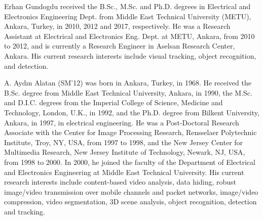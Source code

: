 \documentclass[journal]{IEEEtran}
\begin{document}
\clearpage
\begin{IEEEbiography}{Erhan Gundogdu}
received the B.Sc., M.Sc. and Ph.D. degrees in Electrical and Electronics Engineering Dept. from Middle East Technical University (METU), Ankara, Turkey, in 2010, 2012 and 2017, respectively. He was a Research Assistant at Electrical and Electronics Eng. Dept. at METU, Ankara, from 2010 to 2012, and is currently a Research Engineer in Aselsan Research Center, Ankara. His current research interests include visual tracking, object recognition, and detection.
\end{IEEEbiography}
\begin{IEEEbiography}{A. Ayd\i n Alatan}
(SM’12) was born in Ankara, Turkey, in 1968. He received the B.Sc. degree from Middle East Technical University, Ankara, in 1990, the M.Sc. and D.I.C. degrees from the Imperial College of Science, Medicine and Technology, London, U.K., in 1992, and the Ph.D. degree from Bilkent University, Ankara, in 1997, in electrical engineering. He was a Post-Doctoral Research Associate with the Center for Image Processing Research, Rensselaer Polytechnic Institute, Troy, NY, USA, from 1997 to 1998, and the New Jersey Center for Multimedia Research, New Jersey Institute of Technology, Newark, NJ, USA, from 1998 to 2000. In 2000, he joined the faculty of the Department of Electrical and Electronics Engineering at Middle East Technical University. His current research interests include content-based video analysis, data hiding, robust image/video transmission over mobile channels and packet networks, image/video compression, video segmentation, 3D scene analysis, object recognition, detection and tracking.
\end{IEEEbiography}
\end{document}
